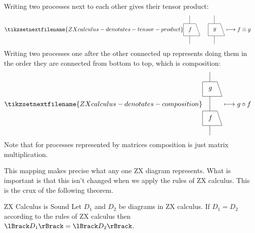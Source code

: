 \documentclass[fleqn]{NotesClass}
\DeclarePairedDelimiter{\denotes}{\lBrack}{\rBrack}
\begin{document}
    Writing two processes next to each other gives their tensor product:
    \begin{equation}
        \tikzsetnextfilename{ZXcalculus-denotates-tensor-product}
        \begin{tikzpicture}[baseline=(f.base)]
            \draw (0, 0) -- ++ (1, 0) -- ++ (-0.25, 0.75) -- ++ (-0.75, 0) -- cycle;
            \node (f) at (0.4, 0.375) {\(f\)};
            \draw (0.375, 0) -- ++ (0, -0.5);
            \draw (0.375, 0.75) -- ++ (0, 0.5);
            \begin{scope}[xshift=1.5cm]
                \draw (0, 0) -- ++ (1, 0) -- ++ (-0.25, 0.75) -- ++ (-0.75, 0) -- cycle;
                \node at (0.4, 0.375) {\(g\)};
                \draw (0.375, 0) -- ++ (0, -0.5);
                \draw (0.375, 0.75) -- ++ (0, 0.5);
            \end{scope}
        \end{tikzpicture}
        \longmapsto f \otimes g
    \end{equation}
    Writing two processes one after the other connected up represents doing them in the order they are connected from bottom to top, which is composition:
    \begin{equation}
        \tikzsetnextfilename{ZXcalculus-denotates-composition}
        \begin{tikzpicture}[baseline=1cm]
            \draw (0, 0) -- ++ (1, 0) -- ++ (-0.25, 0.75) -- ++ (-0.75, 0) -- cycle;
            \node (f) at (0.4, 0.375) {\(f\)};
            \draw (0.375, 0) -- ++ (0, -0.5);
            \draw (0.375, 0.75) -- ++ (0, 0.75);
            \begin{scope}[yshift=1.5cm]
                \draw (0, 0) -- ++ (1, 0) -- ++ (-0.25, 0.75) -- ++ (-0.75, 0) -- cycle;
                \node at (0.4, 0.375) {\(g\)};
                \draw (0.375, 0.75) -- ++ (0, 0.5);
            \end{scope}
        \end{tikzpicture}
        \longmapsto g \circ f
    \end{equation}
    Note that for processes represented by matrices composition is just matrix multiplication.
    
    This mapping makes precise what any one ZX diagram represents.
    What is important is that this isn't changed when we apply the rules of ZX calculus.
    This is the crux of the following theorem.
    
    \begin{thm}{ZX Calculus is Sound}{}
        Let \(D_1\) and \(D_2\) be diagrams in ZX calculus.
        If \(D_1 = D_2\) according to the rules of ZX calculus then \(\denotes{D_1} = \denotes{D_2}\).
    \end{thm}
    
\end{document}
